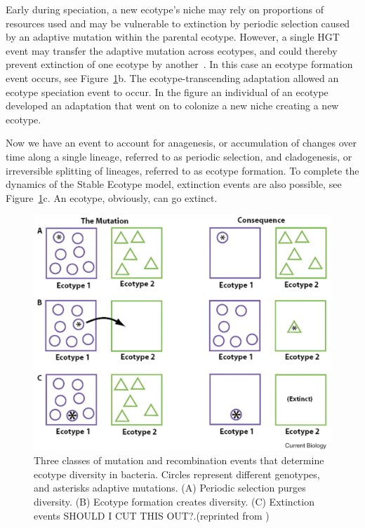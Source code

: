 Early during speciation, a new ecotype's niche may rely on proportions of resources used and may be vulnerable to extinction by periodic selection caused by an adaptive mutation within the parental ecotype.
However, a single HGT event may transfer the adaptive mutation across ecotypes, and could thereby prevent extinction of one ecotype by another~\cite{cohan2008origins}.
In this case an ecotype formation event occurs, see Figure~\ref{fig:StableEvents}b.
The ecotype-transcending adaptation allowed an ecotype speciation event to occur. In the figure an individual of an ecotype developed an adaptation that went on to colonize a new niche creating a new ecotype.

Now we have an event to account for anagenesis, or accumulation of changes over time along a single lineage, referred to as periodic selection, and cladogenesis, or irreversible splitting of lineages, referred to as ecotype formation.
To complete the dynamics of the Stable Ecotype model, extinction events are also possible, see Figure~\ref{fig:StableEvents}c.
An ecotype, obviously, can go extinct.

\begin{figure}[h!]
 \caption{Three classes of mutation and recombination events that determine ecotype diversity in bacteria. Circles represent different genotypes, and asterisks adaptive mutations. (A) Periodic selection purges diversity. (B) Ecotype formation creates diversity. (C) Extinction events SHOULD I CUT THIS OUT?.(reprinted from \protect\cite{cohan2007systematics})}
 \centering
 \label{fig:StableEvents}
 \includegraphics{images/StableEcotypeEvents}
\end{figure}


